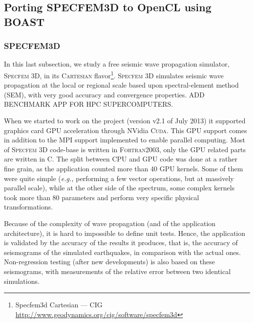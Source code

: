 \newcommand{\productname}[1]{\textsc{#1}}
\newcommand{\latin}[1]{\textit{#1}}

\newcommand{\Specfem}{\productname{Specfem 3D}\xspace}
\newcommand{\Cuda}{\productname{Cuda}\xspace}
\newcommand{\eg}{\latin{e.g.,}\xspace}
\newcommand{\OCL}{\productname{OpenCL}\xspace}
\newcommand{\code}[1]{\texttt{#1}}

\newcommand{\etc}[1]{\latin{etc}}


\subsection{Porting SPECFEM3D to OpenCL using BOAST}
\label{subsec:specfem}

\subsubsection{SPECFEM3D}

In this last subsection, we study a free seismic wave propagation
simulator, \Specfem, in its \productname{Cartesian}
flavor\footnote{Specfem3d Cartesian --- CIG
  \url{http://www.geodynamics.org/cig/software/specfem3d}}. \Specfem
simulates seismic wave propagation at the local or regional scale
based upon spectral-element method (SEM), with very good accuracy and
convergence properties. ADD BENCHMARK APP FOR HPC SUPERCOMPUTERS.

When we started to work on the project (version v2.1 of July 2013) it
supported graphics card GPU acceleration through NVidia \Cuda. This
GPU support comes in addition to the MPI support implemented to enable
parallel computing. Most of \Specfem code-base is written in
\productname{Fortran2003}, only the GPU related parts are written in
C.  The split between CPU and GPU code was done at a rather fine
grain, as the application counted more than 40 GPU kernels. Some of
them were quite simple (\eg performing a few vector operations, but at
massively parallel scale), while at the other side of the spectrum,
some complex kernels took more than 80 parameters and perform very
specific physical transformations.

Because of the complexity of wave propagation (and of the application
architecture), it is hard to impossible to define unit tests. Hence,
the application is validated by the accuracy of the results it
produces, that is, the accuracy of seismograms of the simulated
earthquakes, in comparison with the actual ones. Non-regression
testing (after new developments) is also based on these seismograms,
with measurements of the relative error between two identical
simulations.

